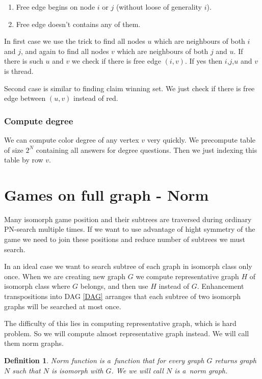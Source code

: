 \begin{enumerate} 
	\item Free edge begins on node $i$ or $j$ (without loose of generality $i$). 
	\item Free edge doesn't contains any of them.  
\end{enumerate}

In first case we use the trick to find all nodes $u$ which are neighbours of both
$i$ and $j$, and again to find all nodes $v$ which are neighbours of
both $j$ and $u$. If there is such $u$ and $v$ we check if there is free edge
$(i,v)$. If yes then $i$,$j$,$u$ and $v$ is thread.  

Second case is similar to finding claim winning set. We just check if there is free
edge between $(u,v)$ instead of red.  

\subsubsection{ Compute degree }

We can compute color degree of any vertex $v$ very quickly. We precompute table of size
$2^N$ containing all answers for degree questions. Then we just indexing this table by
row $v$. 

\section{ Games on full graph - Norm } \label{norm} 

Many isomorph game position and their subtrees are traversed during ordinary
PN-search multiple times. If we want to use advantage of hight symmetry of the
game we need to join these positions and reduce number of subtrees we must
search.

In an ideal case we want to search subtree of each graph in isomorph class only
once. When we are creating new graph $G$ we compute 
representative graph $H$ of isomorph class where $G$ belongs, and then use $H$
instead of $G$. Enhancement transpositions into DAG \ref{DAG} arranges that
each subtree of two isomorph graphs will be searched at most once.

The difficulty of this lies in computing representative graph, which is hard problem.
So we will compute almost representative graph instead. We will call
them norm graphs.

\newtheorem*{norm}{Definition}	
\begin{norm}
{\sl Norm function} is a~function that for
every graph $G$ returns graph $N$ such that $N$ is isomorph with $G$. We we will call
$N$ is a~{\sl norm graph}.
\end{norm}

